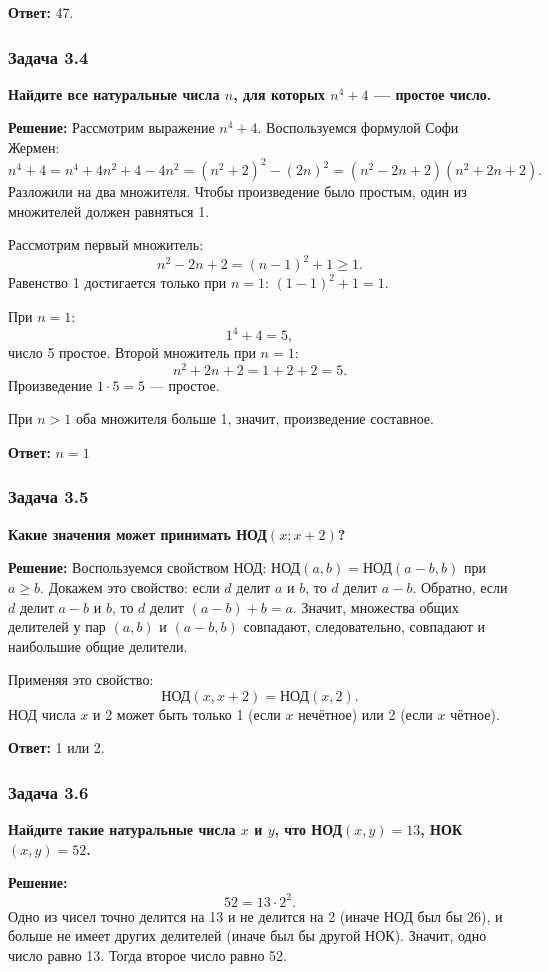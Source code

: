 \documentclass[12pt, a4paper]{article}
\begin{document}
\textbf{Ответ:} 47.

\subsubsection*{Задача 3.4}
\textbf{Найдите все натуральные числа $n$, для которых $n^4 + 4$ — простое число.}

\textbf{Решение:}
Рассмотрим выражение $n^4 + 4$. Воспользуемся формулой Софи Жермен:
\[
n^4 + 4 = n^4 + 4n^2 + 4 - 4n^2 = (n^2 + 2)^2 - (2n)^2 = (n^2 - 2n + 2)(n^2 + 2n + 2).
\]
Разложили на два множителя. Чтобы произведение было простым, один из множителей должен равняться 1.

Рассмотрим первый множитель:
\[
n^2 - 2n + 2 = (n-1)^2 + 1 \ge 1.
\]
Равенство 1 достигается только при $n = 1$: $(1-1)^2 + 1 = 1$.

При $n = 1$:
\[
1^4 + 4 = 5,
\]
число 5 простое. Второй множитель при $n = 1$:
\[
n^2 + 2n + 2 = 1 + 2 + 2 = 5.
\]
Произведение $1 \cdot 5 = 5$ — простое.

При $n > 1$ оба множителя больше 1, значит, произведение составное.

\textbf{Ответ:} $n = 1$

\subsubsection*{Задача 3.5}
\textbf{Какие значения может принимать НОД$(x; x+2)$?}

\textbf{Решение:}
Воспользуемся свойством НОД: $\text{НОД}(a, b) = \text{НОД}(a-b, b)$ при $a \ge b$. Докажем это свойство: если $d$ делит $a$ и $b$, то $d$ делит $a-b$. Обратно, если $d$ делит $a-b$ и $b$, то $d$ делит $(a-b)+b = a$. Значит, множества общих делителей у пар $(a, b)$ и $(a-b, b)$ совпадают, следовательно, совпадают и наибольшие общие делители.

Применяя это свойство:
\[
\text{НОД}(x, x+2) = \text{НОД}(x, 2).
\]
НОД числа $x$ и 2 может быть только 1 (если $x$ нечётное) или 2 (если $x$ чётное).

\textbf{Ответ:} 1 или 2.

\subsubsection*{Задача 3.6}
\textbf{Найдите такие натуральные числа $x$ и $y$, что НОД$(x, y) = 13$, НОК$(x, y) = 52$.}

\textbf{Решение:}
\[
52 = 13 \cdot 2^2.
\]
Одно из чисел точно делится на 13 и не делится на 2 (иначе НОД был бы 26), и больше не имеет других делителей (иначе был бы другой НОК). Значит, одно число равно 13. Тогда второе число равно 52.
\end{document}
